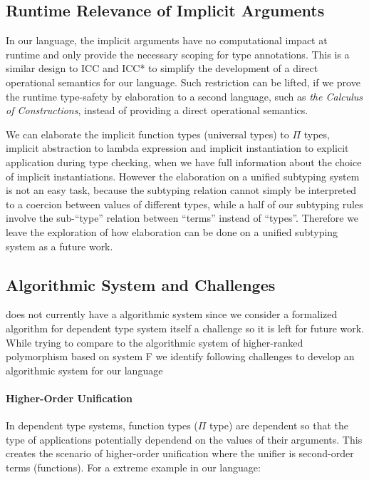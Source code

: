 \subsection{Runtime Relevance of Implicit Arguments}

In our language, the implicit arguments have no computational impact at runtime
and only provide the necessary scoping for type annotations. This is
a similar design to ICC\cite{miquel2001implicit} and
ICC*\cite{barras2008implicit} to simplify the development of a direct
operational semantics for our language. Such restriction can be lifted, if we
prove the runtime type-safety by elaboration to a second language,
such as \emph{the Calculus of Constructions}\cite{coc},
instead of providing a direct operational semantics.

We can elaborate the implicit function types (universal types) to $\Pi$ types,
implicit abstraction to lambda expression and implicit instantiation to explicit
application during type checking, when we have full information about the
choice of implicit instantiations. However the elaboration on a unified subtyping
system is not an easy task, because the subtyping relation cannot simply be interpreted
to a coercion between values of different types, while a half of our subtyping
rules involve the sub-``type'' relation between ``terms'' instead of ``types''.
Therefore we leave the exploration of how elaboration can be done
on a unified subtyping system as a future work.

\subsection{Algorithmic System and Challenges}

\name does not currently have a algorithmic system since we
consider a formalized algorithm for dependent type system itself a challenge so it
is left for future work. While trying to compare to the algorithmic system
of higher-ranked polymorphism based on system F
\cite{dunfield2013complete,zhao19mechanical}
we identify following challenges to develop an algorithmic system for our language

\paragraph{Higher-Order Unification}

In dependent type systems, function types ($\Pi$ type) are dependent so that
the type of applications potentially dependend on the values of their arguments.
This creates the scenario of higher-order unification where the unifier is
second-order terms (functions). For a extreme example in our language:

